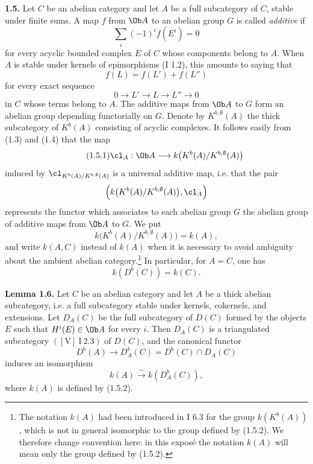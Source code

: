 \textbf{1.5.} Let \(C\) be an abelian category and let \(A\) be a full subcategory of \(C\), stable under finite sums. A map \(f\) from \(\Ob A\) to an abelian group \(G\) is called \emph{additive} if
\[
 \sum_i(-1)^i f(E^i)=0
\]
for every acyclic bounded complex \(E\) of \(C\) whose components belong to \(A\). When \(A\) is stable under kernels of epimorphisms (I 1.2), this amounts to saying that
\[
 f(L)=f(L')+f(L'')
\]
for every exact sequence
\[
 0\longrightarrow L'\longrightarrow L\longrightarrow L''\longrightarrow0
\]
in \(C\) whose terms belong to \(A\). The additive maps from \(\Ob A\) to \(G\) form an abelian group depending functorially on \(G\). Denote by \(K^{b,\emptyset}(A)\) the thick subcategory of \(K^b(A)\) consisting of acyclic complexes. It follows easily from (1.3) and (1.4) that the map
\begin{equation}\tag{1.5.1}
 \cl_A:\Ob A\longrightarrow k\bigl(K^b(A)/K^{b,\emptyset}(A)\bigr)
\end{equation}
induced by \(\cl_{K^b(A)/K^{b,\emptyset}(A)}\) is a universal additive map, i.e. that the pair
\[
 \left(k\bigl(K^b(A)/K^{b,\emptyset}(A)\bigr),\cl_A\right)
\]
represents the functor which associates to each abelian group \(G\) the abelian group of additive maps from \(\Ob A\) to \(G\). We put
\begin{equation}\tag{1.5.2}
 k\bigl(K^b(A)/K^{b,\emptyset}(A)\bigr)=k(A),
\end{equation}
and write \(k(A,C)\) instead of \(k(A)\) when it is necessary to avoid ambiguity about the ambient abelian category.\footnote{The notation \(k(A)\) had been introduced in I 6.3 for the group \(k(K^b(A))\), which is not in general isomorphic to the group defined by (1.5.2). We therefore change convention here: in this exposé the notation \(k(A)\) will mean only the group defined by (1.5.2).}
In particular, for \(A=C\), one has
\begin{equation}\tag{1.5.3}
 k(D^b(C))=k(C).
\end{equation}

\textbf{Lemma 1.6.} Let \(C\) be an abelian category and let \(A\) be a thick abelian subcategory, i.e. a full subcategory stable under kernels, cokernels, and extensions. Let \(D_A(C)\) be the full subcategory of \(D(C)\) formed by the objects \(E\) such that \(H^i(E)\in\Ob A\) for every \(i\). Then \(D_A(C)\) is a triangulated subcategory \(([\mathrm V]\ \mathrm I\ 2.3)\) of \(D(C)\), and the canonical functor
\[
 D^b(A)\longrightarrow D_A^b(C)=D^b(C)\cap D_A(C)
\]
induces an isomorphism
\[
 k(A)\xrightarrow{\sim} k(D_A^b(C)),
\]
where \(k(A)\) is defined by (1.5.2).

